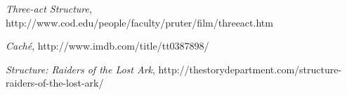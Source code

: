 \documentclass{article}
\begin{document}
\begin{thebibliography}{9}

	\emph{Three-act Structure}, http://www.cod.edu/people/faculty/pruter/film/threeact.htm

	\emph{Cach\'{e}}, http://www.imdb.com/title/tt0387898/

	\emph{Structure: Raiders of the Lost Ark}, http://thestorydepartment.com/structure-raiders-of-the-lost-ark/

\end{thebibliography}
\end{document}
